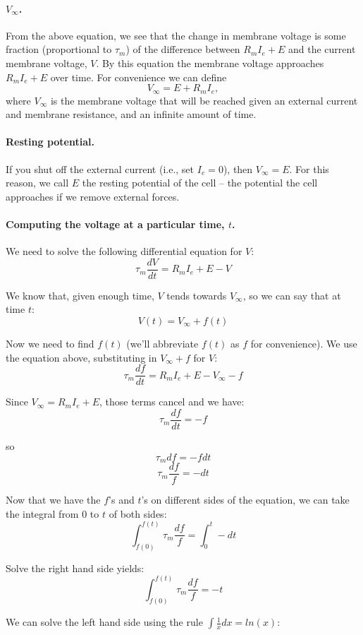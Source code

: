 \documentclass[12pt]{article}
\begin{document}
\paragraph{$V_\infty$.}  From the above equation, we see that the
change in membrane voltage is some fraction (proportional to $\tau_m$)
of the difference between $R_mI_e + E$ and the current membrane
voltage, $V$.  By this equation the membrane voltage approaches
$R_mI_e + E$ over time.  For convenience we can define
\[
V_\infty = E + R_mI_e,
\]
where $V_\infty$ is the membrane voltage that will be reached given an
external current and membrane resistance, and an infinite amount of time.  

\paragraph{Resting potential.}  If you shut off the external current (i.e., set $I_e = 0$), then $V_\infty = E$.  For this reason, we call $E$ the resting potential of the cell -- the potential the cell approaches if we remove external forces.

\paragraph{Computing the voltage at a particular time, $t$.}  We need to solve the following differential equation for $V$:
\[
\tau_m\frac{dV}{dt} = R_mI_e + E - V
\]

We know that, given enough time, $V$ tends towards $V_\infty$, so we can say that at time $t$:
\[
V(t) = V_\infty + f(t)
\]

Now we need to find $f(t)$ (we'll abbreviate $f(t)$ as $f$ for
convenience).  We use the equation above, substituting in $V_\infty +
f$ for $V$:
\[
\tau_m \frac{df}{dt} = R_mI_e + E - V_\infty - f
\]

Since $V_\infty = R_mI_e + E$, those terms cancel and we have:
\[
\tau_m \frac{df}{dt} = -f
\]

so
\[
\tau_m df = -fdt
\]
\[
\tau_m\frac{df}{f} = -dt
\]

Now that we have the $f$'s and $t$'s on different sides of the equation, we can take the integral from 0 to $t$ of both sides:
\[
\int_{f(0)}^{f(t)} \tau_m \frac{df}{f} = \int_0^t -dt
\]

Solve the right hand side yields:
\[
\int_{f(0)}^{f(t)} \tau_m \frac{df}{f} = -t
\]

We can solve the left hand side using the rule $\int \frac{1}{x} dx = ln(x)$:
\end{document}
